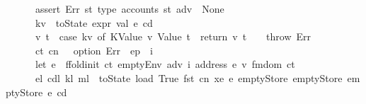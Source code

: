 \begin{isabellebody}
\ \ \ \ \ \ assert\ Err\ {\isacharparenleft}{\kern0pt}{\isasymlambda}st{\isachardot}{\kern0pt}\ type\ {\isacharparenleft}{\kern0pt}accounts\ st\ adv{\isacharparenright}{\kern0pt}\ {\isacharequal}{\kern0pt}\ None{\isacharparenright}{\kern0pt}{\isacharsemicolon}{\kern0pt}\isanewline
\ \ \ \ \ \ kv\ {\isasymleftarrow}\ toState\ {\isacharparenleft}{\kern0pt}expr\ val\ e\ cd{\isacharparenright}{\kern0pt}{\isacharsemicolon}{\kern0pt}\isanewline
\ \ \ \ \ \ {\isacharparenleft}{\kern0pt}v{\isacharcomma}{\kern0pt}\ t{\isacharparenright}{\kern0pt}\ {\isasymleftarrow}\ case\ kv\ of\ {\isacharparenleft}{\kern0pt}KValue\ v{\isacharcomma}{\kern0pt}\ Value\ t{\isacharparenright}{\kern0pt}\ {\isasymRightarrow}\ return\ {\isacharparenleft}{\kern0pt}v{\isacharcomma}{\kern0pt}\ t{\isacharparenright}{\kern0pt}\ {\isacharbar}{\kern0pt}\ {\isacharunderscore}{\kern0pt}\ {\isasymRightarrow}\ throw\ Err{\isacharsemicolon}{\kern0pt}\isanewline
\ \ \ \ \ \ {\isacharparenleft}{\kern0pt}ct{\isacharcomma}{\kern0pt}\ cn{\isacharcomma}{\kern0pt}\ {\isacharunderscore}{\kern0pt}{\isacharparenright}{\kern0pt}\ {\isasymleftarrow}\ option\ Err\ {\isacharparenleft}{\kern0pt}{\isasymlambda}{\isacharunderscore}{\kern0pt}{\isachardot}{\kern0pt}\ ep\ {\isachardollar}{\kern0pt}{\isachardollar}{\kern0pt}\ i{\isacharparenright}{\kern0pt}{\isacharsemicolon}{\kern0pt}\isanewline
\ \ \ \ \ \ let\ e{\isacharprime}{\kern0pt}\ {\isacharequal}{\kern0pt}\ ffold{\isacharunderscore}{\kern0pt}init\ ct\ {\isacharparenleft}{\kern0pt}emptyEnv\ adv\ i\ {\isacharparenleft}{\kern0pt}address\ e{\isacharparenright}{\kern0pt}\ v{\isacharparenright}{\kern0pt}\ {\isacharparenleft}{\kern0pt}fmdom\ ct{\isacharparenright}{\kern0pt}{\isacharsemicolon}{\kern0pt}\isanewline
\ \ \ \ \ \ {\isacharparenleft}{\kern0pt}e\isactrlsub l{\isacharcomma}{\kern0pt}\ cd\isactrlsub l{\isacharcomma}{\kern0pt}\ k\isactrlsub l{\isacharcomma}{\kern0pt}\ m\isactrlsub l{\isacharparenright}{\kern0pt}\ {\isasymleftarrow}\ toState\ {\isacharparenleft}{\kern0pt}load\ True\ {\isacharparenleft}{\kern0pt}fst\ cn{\isacharparenright}{\kern0pt}\ xe\ e{\isacharprime}{\kern0pt}\ emptyStore\ emptyStore\ emptyStore\ e\ cd{\isacharparenright}{\kern0pt}{\isacharsemicolon}{\kern0pt}\isanewline

\end{isabellebody}
